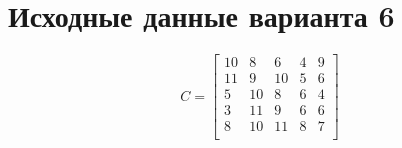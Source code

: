 \section{Исходные данные варианта 6}

\begingroup
\renewcommand*{\arraystretch}{0.6}
\begin{equation}
	C = \begin{bmatrix}
		10 &  8 &  6 &  4 &  9 \\
		11 &  9 & 10 &  5 &  6 \\
		 5 & 10 &  8 &  6 &  4 \\
		 3 & 11 &  9 &  6 &  6 \\
		 8 & 10 & 11 &  8 &  7 \\
	\end{bmatrix}
\end{equation}
\endgroup
